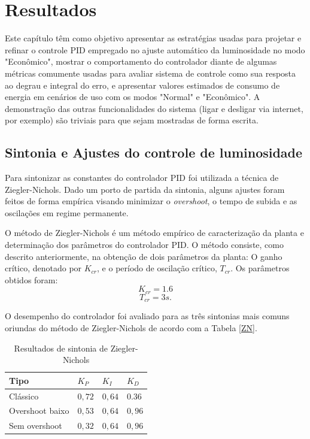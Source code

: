 \chapter{Resultados}

Este capítulo têm como objetivo apresentar as estratégias usadas para projetar e refinar o controle PID empregado no ajuste automático da luminosidade no modo "Econômico", mostrar o comportamento do controlador diante de algumas métricas comumente usadas para avaliar sistema de controle como sua resposta ao degrau e integral do erro, e apresentar valores estimados de consumo de energia em cenários de uso com os modos "Normal" e "Econômico". 
A demonstração das outras funcionalidades do sistema (ligar e desligar via internet, por exemplo) são triviais para que sejam mostradas de forma escrita.

\section{Sintonia e Ajustes do controle de luminosidade}

Para sintonizar as constantes do controlador PID foi utilizada a técnica de Ziegler-Nichols. Dado um porto de partida da sintonia, alguns ajustes foram feitos de forma empírica visando minimizar o \textit{overshoot}, o tempo de subida e as oscilações em regime permanente.

O método de Ziegler-Nichols é um método empírico de caracterização da planta e determinação dos parâmetros do controlador PID. O método consiste, como descrito anteriormente, na obtenção de dois parâmetros da planta: O ganho crítico, denotado por $K_{cr}$, e o período de oscilação crítico, $T_{cr}$. Os parâmetros obtidos foram:
\begin{equation}
    \label{eq:rs1}
    K_{cr} = 1.6
\end{equation}
\begin{equation}
    \label{eq:rs1.1}
    T_{cr} = 3 s.
\end{equation}

O desempenho do controlador foi avaliado para as três sintonias mais comuns oriundas do método de Ziegler-Nichols de acordo  com a Tabela \ref{ZN}.

\begin{table}[htb]
    \centering
    \caption{Resultados de sintonia de Ziegler-Nichols}
    \label{ZNvalores}
    \begin{tabular}{llll}
    \hline
    Tipo            & $K_P$ & $K_I$ & $K_D$ \\ 
    \hline \hline
    Clássico        & $0,72$ & $0,64$ & $0.36$ \\ 
    \hline
    Overshoot baixo & $0,53$ & $0,64$ & $0,96$ \\ 
    \hline
    Sem overshoot   & $0,32$ & $0,64$ & $0,96$ \\
    \hline
    \end{tabular}
\end{table}

